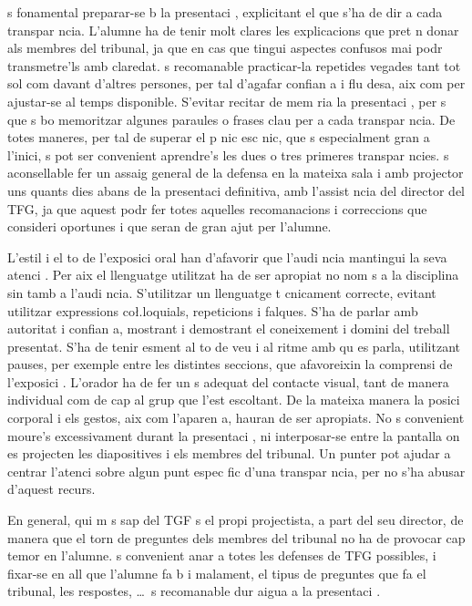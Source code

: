         s fonamental preparar-se b  la presentaci , explicitant el que s'ha de dir a cada transpar ncia. L'alumne ha de tenir molt clares les explicacions que pret n donar als membres del tribunal, ja que en cas que tingui aspectes confusos mai podr  transmetre'ls amb claredat.  s recomanable practicar-la repetides vegades tant tot sol com davant d'altres persones, per tal d'agafar confian a i flu desa, aix  com per ajustar-se al temps disponible. S'evitar  recitar de mem ria la presentaci , per  s  que  s bo memoritzar algunes paraules o frases clau per a cada transpar ncia. De totes maneres, per tal de superar el p nic esc nic, que  s especialment gran a l'inici, s  pot ser convenient aprendre's les dues o tres primeres transpar ncies.  s aconsellable fer un assaig general de la defensa en la mateixa sala i amb projector uns quants dies abans de la presentaci  definitiva, amb l'assist ncia del director del \ac{TFG}, ja que aquest podr  fer totes aquelles recomanacions i correccions que consideri oportunes i que seran de gran ajut per l'alumne.

        L'estil i el to de l'exposici  oral han d'afavorir que l'audi ncia mantingui la seva atenci . Per aix  el llenguatge utilitzat ha de ser apropiat no nom s a la disciplina sin  tamb  a l'audi ncia. S'utilitzar  un llenguatge t cnicament correcte, evitant utilitzar expressions co\l.loquials, repeticions i falques. S'ha de parlar amb autoritat i confian a, mostrant i demostrant el coneixement i domini del treball presentat. S'ha de tenir esment al to de veu i al ritme amb qu  es parla, utilitzant pauses, per exemple entre les distintes seccions, que afavoreixin la comprensi  de l'exposici . L'orador ha de fer un  s adequat del contacte visual, tant de manera individual com de cap al grup que l'est  escoltant. De la mateixa manera la posici  corporal i els gestos, aix  com l'aparen a, hauran de ser apropiats. No  s convenient moure's excessivament durant la presentaci , ni interposar-se entre la pantalla on es projecten les diapositives i els membres del tribunal. Un punter pot ajudar a centrar l'atenci  sobre algun punt espec fic d'una transpar ncia, per  no s'ha abusar d'aquest recurs.

        En general, qui m s sap del TGF  s el propi projectista, a part del seu director, de manera que el torn de preguntes dels membres del tribunal no ha de provocar cap temor en l'alumne.  s convenient anar a totes les defenses de \ac{TFG} possibles, i fixar-se en all  que l'alumne fa b  i malament, el tipus de preguntes que fa el tribunal, les respostes, \ldots\  s recomanable dur aigua a la presentaci .

